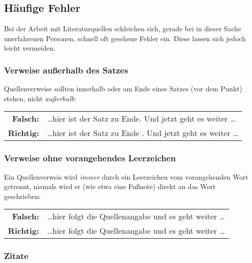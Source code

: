 \subsection{Häufige Fehler}

Bei der Arbeit mit Literaturquellen schleichen sich, gerade bei in dieser Sache
unerfahrenen Personen, schnell oft gesehene Fehler ein. Diese lassen sich jedoch
leicht vermeiden.

\subsubsection{Verweise außerhalb des Satzes}

Quellenverweise sollten innerhalb oder am Ende eines Satzes (\dah vor dem
Punkt) stehen, nicht \emph{außerhalb}:
%
\begin{center}
    \begin{tabular}{rl}
        \textbf{Falsch:}  & \ldots hier ist der Satz zu Ende.
        \cite{Oetiker2021} Und jetzt geht es weiter \ldots \\
        \textbf{Richtig:} & \ldots hier ist der Satz zu Ende
        \cite{Oetiker2021}. Und jetzt geht es weiter \ldots
    \end{tabular}
\end{center}

\subsubsection{Verweise ohne vorangehendes Leerzeichen}

Ein Quellenverweis wird \emph{immer} durch ein Leerzeichen vom vorangehenden
Wort getrennt, niemals wird er (wie etwa eine Fußnote) direkt an das Wort
geschrieben:
%
\begin{center}
    \begin{tabular}{rl}
        \textbf{Falsch:}  & \ldots hier folgt die
        Quellenangabe\cite{Oetiker2021} und es geht weiter \ldots  \\
        \textbf{Richtig:} & \ldots hier folgt die Quellenangabe
        \cite{Oetiker2021} und es geht weiter \ldots
    \end{tabular}
\end{center}

\subsubsection{Zitate}

